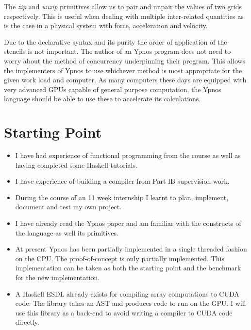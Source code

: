 The \emph{zip} and \emph{unzip} primitives allow us to pair and unpair the 
values of two grids respectively. This is useful when dealing with multiple 
inter-related quantities as is the case in a physical system with force, 
acceleration and velocity.

Due to the declarative syntax and its purity the order of application of the 
stencils is not important. The author of an Ypnos program does not need to 
worry about the method of concurrency underpinning their program. This allows 
the implementers of Ypnos to use whichever method is most appropriate for the 
given work load and computer. As many computers these days are equipped with 
very advanced GPUs capable of general purpose computation, the Ypnos language 
should be able to use these to accelerate its calculations.

\section*{Starting Point}

\begin{itemize}

\item I have had experience of functional programming from the course as well 
as having completed some Haskell tutorials. 

\item I have experience of building a compiler from Part IB supervision work.

\item During the course of an 11 week internship I learnt to plan, implement, 
document and test my own project.

\item I have already read the Ypnos paper and am familiar with the constructs 
of the language as well its primitives.

\item At present Ypnos has been partially implemented in a single threaded 
fashion on the CPU. The proof-of-concept is only partially implemented. This 
implementation can be taken as both the starting point and the benchmark for 
the new implementation.

\item A Haskell ESDL already exists for compiling array computations to CUDA 
code. The library takes an AST and produces code to run on the GPU. I will use 
this library as a back-end to avoid writing a compiler to CUDA code directly.

\end{itemize}


